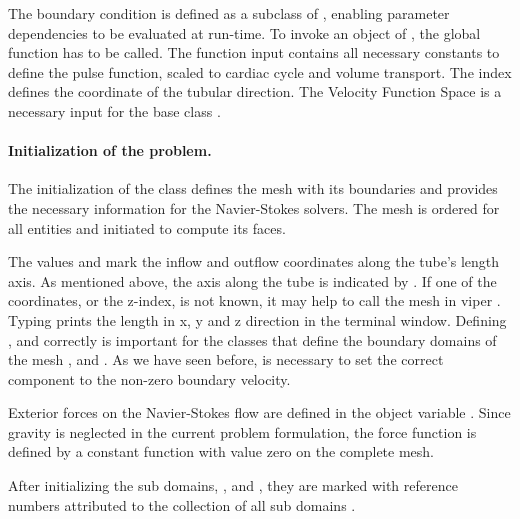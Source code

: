 The boundary condition  is defined as a subclass of
, enabling parameter dependencies to be evaluated at run-time. To invoke an object of , the global function
 has to be called. The function input
contains all necessary constants to define the pulse function, scaled
to cardiac cycle and volume transport. The index 
defines the coordinate of the tubular direction. The Velocity Function
Space  is a necessary input for the base class .

\paragraph{Initialization of the problem.} The initialization of the class  defines the mesh with its boundaries and provides the necessary information for the Navier-Stokes solvers. The mesh is ordered for all entities and initiated to compute its faces.

The values  and  mark the inflow and outflow
coordinates along the tube's length axis. As mentioned above, the axis
along the tube is indicated by . If one of the
coordinates, or the z-index, is not known, it may help to call the mesh
in viper . Typing  prints the
length in x, y and z direction in the terminal window. Defining
,  and  correctly is important
for the classes that define the boundary domains of the mesh
,  and . As we have seen before,
 is necessary to set the correct component to the
non-zero boundary velocity.

Exterior forces on the Navier-Stokes flow are defined in the object variable . Since gravity is neglected in the current problem formulation, the force function  is defined by a constant function  with value zero on the complete mesh.

After initializing the sub domains, ,  and , they are marked with reference numbers attributed to the collection of all sub domains .

